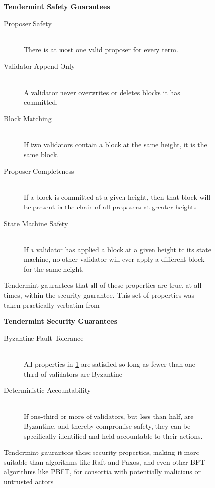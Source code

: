 \begin{figure}[]
	\textbf{Tendermint Safety Guarantees}
	\begin{description}
	  \item[Proposer Safety] \hfill \\
		There is at most one valid proposer for every term.
	  \item[Validator Append Only] \hfill \\
		A validator never overwrites or deletes blocks it has committed.
	  \item[Block Matching] \hfill \\
		If two validators contain a block at the same height, it is the same block.
	  \item[Proposer Completeness] \hfill \\
		If a block is committed at a given height, then that block will be present in the chain of all proposers at greater heights.
	  \item[State Machine Safety] \hfill \\
		If a validator has applied a block at a given height to its state machine, no other validator will ever apply a different block for the same height.
	\end{description}
  	\caption[Tendermint Safety Guarantees]{Tendermint gaurantees that all of these properties are true, at all times, within the security gaurantee. This set of properties was taken practically verbatim from \cite{raft_thesis}}
	\label{fig:tendermint_gaurantees}
\end{figure}

\begin{figure}[]
	\textbf{Tendermint Security Guarantees}
	\begin{description}
	  \item[Byzantine Fault Tolerance] \hfill \\
		All properties in \ref{fig:tendermint_gaurantees} are satisfied so long as fewer than one-third of validators are Byzantine
	  \item[Deterministic Accountability] \hfill \\
		If one-third or more of validators, but less than half, are Byzantine, and thereby compromise safety, 
		they can be specifically identified and held accountable to their actions.
	\end{description}
  	\caption[Tendermint Security Guarantees]{Tendermint gaurantees these security properties, making it more suitable than algorithms like Raft and Paxos, and even other BFT algorithms like PBFT, for consortia with potentially malicious or untrusted actors}
	\label{fig:tendermint_security}
\end{figure}


